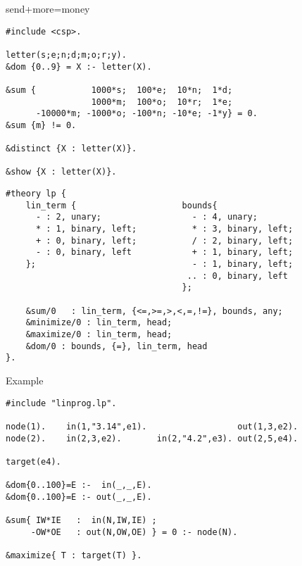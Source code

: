 \documentclass[t,fleqn]{beamer}
\begin{document}
\begin{frame}[fragile,shrink=20]{send+more=money}
\begin{lstlisting}
#include <csp>.

letter(s;e;n;d;m;o;r;y).
&dom {0..9} = X :- letter(X).

&sum {           1000*s;  100*e;  10*n;  1*d;
                 1000*m;  100*o;  10*r;  1*e;
      -10000*m; -1000*o; -100*n; -10*e; -1*y} = 0.
&sum {m} != 0.

&distinct {X : letter(X)}.

&show {X : letter(X)}.
\end{lstlisting}
\end{frame}
\begin{frame}[fragile,shrink=20]{\clingo[LP]}
\begin{lstlisting}
#theory lp {
    lin_term {                     bounds{               
      - : 2, unary;                  - : 4, unary;         
      * : 1, binary, left;           * : 3, binary, left;  
      + : 0, binary, left;           / : 2, binary, left;  
      - : 0, binary, left            + : 1, binary, left;  
    };                               - : 1, binary, left;  
                                    .. : 0, binary, left  
                                   };

    &sum/0   : lin_term, {<=,>=,>,<,=,!=}, bounds, any;
    &minimize/0 : lin_term, head;
    &maximize/0 : lin_term, head;
    &dom/0 : bounds, {=}, lin_term, head
}.
\end{lstlisting}
\end{frame}
\begin{frame}[fragile,shrink=20]{Example}
\begin{lstlisting}
#include "linprog.lp".

node(1).    in(1,"3.14",e1).                  out(1,3,e2).
node(2).    in(2,3,e2).       in(2,"4.2",e3). out(2,5,e4).

target(e4).

&dom{0..100}=E :-  in(_,_,E).
&dom{0..100}=E :- out(_,_,E).

&sum{ IW*IE   :  in(N,IW,IE) ;
     -OW*OE   : out(N,OW,OE) } = 0 :- node(N).

&maximize{ T : target(T) }.
\end{lstlisting}
\end{frame}
\end{document}
